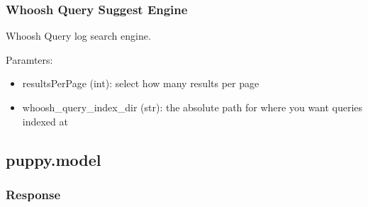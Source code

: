 \documentclass[letterpaper,10pt,english]{sphinxmanual}
\begin{document}
\subsubsection{Whoosh Query Suggest Engine}
\label{api3.0:module-puppy.search.engine.whooshQuerySuggestEngine}\label{api3.0:whoosh-query-suggest-engine}

\begin{fulllineitems}
\label{api3.0:puppy.search.engine.whooshQuerySuggestEngine.WhooshQuerySuggestEngine}
Whoosh Query log search engine.

Paramters:
\begin{itemize}
\item {} 
resultsPerPage (int): select how many results per page

\item {} 
whoosh\_query\_index\_dir (str): the absolute path for where you want queries indexed at

\end{itemize}

\end{fulllineitems}



\subsection{puppy.model}
\label{api3.0:puppy-model}\label{api3.0:module-puppy.model}

\subsubsection{Response}
\label{api3.0:puppy-response}\label{api3.0:response}
\end{document}
